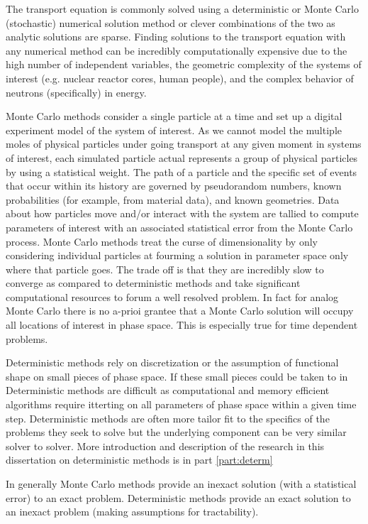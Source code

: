 The transport equation is commonly solved using a deterministic or Monte Carlo (stochastic) \cite{lux_1998} numerical solution method or clever combinations of the two \cite{monke_phd, pasmann_phd} as analytic solutions are sparse.
Finding solutions to the transport equation with any numerical method can be incredibly computationally expensive due to the high number of independent variables, the geometric complexity of the systems of interest (e.g. nuclear reactor cores, human people), and the complex behavior of neutrons (specifically) in energy.

Monte Carlo methods consider a single particle at a time and set up a digital experiment model of the system of interest.
As we cannot model the multiple moles of physical particles under going transport at any given moment in systems of interest, each simulated particle actual represents a group of physical particles by using a statistical weight.
The path of a particle and the specific set of events that occur within its history are governed by pseudorandom numbers, known probabilities (for example, from material data), and known geometries. Data about how particles move and/or interact with the system are tallied to compute parameters of interest with an associated statistical error from the Monte Carlo process.
Monte Carlo methods treat the curse of dimensionality by only considering individual particles at fourming a solution in parameter space only where that particle goes.
The trade off is that they are incredibly slow to converge as compared to deterministic methods and take significant computational resources to forum a well resolved problem.
In fact for analog Monte Carlo there is no a-prioi grantee that a Monte Carlo solution will occupy all locations of interest in phase space.
This is especially true for time dependent problems.

Deterministic methods rely on discretization or the assumption of functional shape on small pieces of phase space.
If these small pieces could be taken to in
Deterministic methods are difficult as computational and memory efficient algorithms require itterting on all parameters of phase space within a given time step.
Deterministic methods are often more tailor fit to the specifics of the problems they seek to solve but the underlying component can be very similar solver to solver.
More introduction and description of the research in this dissertation on deterministic methods is in part \ref{part:determ}

In generally Monte Carlo methods provide an inexact solution (with a statistical error) to an exact problem. Deterministic methods provide an exact solution to an inexact problem (making assumptions for tractability).


